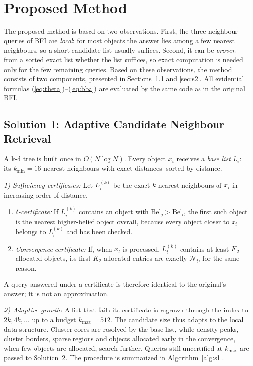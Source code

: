 \documentclass[journal]{IEEEtran}
\newcommand{\Bel}{\mathrm{Bel}}
\begin{document}
\section{Proposed Method}\label{sec:method}
The proposed method is based on two observations. First, the three neighbour queries of BFI are \emph{local}: for most objects the answer lies among a few nearest neighbours, so a short candidate list usually suffices. Second, it can be \emph{proven} from a sorted exact list whether the list suffices, so exact computation is needed only for the few remaining queries. Based on these observations, the method consists of two components, presented in Sections~\ref{sec:s1} and \ref{sec:s2}. All evidential formulas (\ref{eq:theta})--(\ref{eq:bba}) are evaluated by the same code as in the original BFI.

\subsection{Solution 1: Adaptive Candidate Neighbour Retrieval}\label{sec:s1}
A k-d tree is built once in $O(N\log N)$. Every object $x_i$ receives a \emph{base list} $L_i$: its $k_{\min}=16$ nearest neighbours with exact distances, sorted by distance.

\emph{1) Sufficiency certificates:} Let $L_i^{(k)}$ be the exact $k$ nearest neighbours of $x_i$ in increasing order of distance.
\begin{enumerate}
\item[a)] \emph{$\delta$-certificate:} If $L_i^{(k)}$ contains an object with $\Bel_j>\Bel_i$, the first such object is the nearest higher-belief object overall, because every object closer to $x_i$ belongs to $L_i^{(k)}$ and has been checked.
\item[b)] \emph{Convergence certificate:} If, when $x_t$ is processed, $L_t^{(k)}$ contains at least $K_2$ allocated objects, its first $K_2$ allocated entries are exactly $\mathcal{N}_t$, for the same reason.
\end{enumerate}
A query answered under a certificate is therefore identical to the original's answer; it is not an approximation.

\emph{2) Adaptive growth:} A list that fails its certificate is regrown through the index to $2k, 4k, \ldots$ up to a budget $k_{\max}=512$. The candidate size thus adapts to the local data structure. Cluster cores are resolved by the base list, while density peaks, cluster borders, sparse regions and objects allocated early in the convergence, when few objects are allocated, search further. Queries still uncertified at $k_{\max}$ are passed to Solution~2. The procedure is summarized in Algorithm~\ref{alg:s1}.
\end{document}

